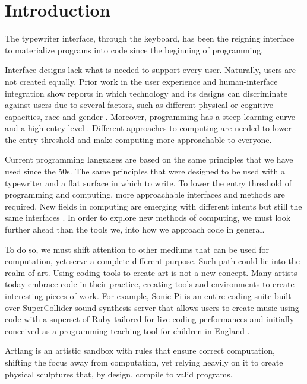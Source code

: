 
\chapter{Introduction}
\label{cha:introduction}
The typewriter interface, through the keyboard, has been the reigning interface to materialize programs into code since the beginning of programming.

Interface designs lack what is needed to support every user. Naturally, users are not created equally.
Prior work in the user experience and human-interface integration show reports in which technology and its designs can discriminate against users due to several factors,
such as different physical or cognitive capacities, race and gender \cite{ko23}.
Moreover, programming has a steep learning curve and a high entry level \cite{bosse17}.
Different approaches to computing are needed to lower the entry threshold and make computing more approachable to everyone.

Current programming languages are based on the same principles that we have used since the 50s.
The same principles that were designed to be used with a typewriter and a flat surface in which to write.
To lower the entry threshold of programming and computing, more approachable interfaces and methods are required.
New fields in computing are emerging with different intents but still the same interfaces \cite{hongji16}.
In order to explore new methods of computing, we must look further ahead than the tools we, into how we approach code in general.

To do so, we must shift attention to other mediums that can be used for computation, yet serve a complete different purpose.
Such path could lie into the realm of art. Using coding tools to create art is not a new concept.
Many artists today embrace code in their practice, creating tools and environments to create interesting pieces of work. 
For example, Sonic Pi is an entire coding suite built over SuperCollider sound synthesis server that allows users to create music using code with a superset of Ruby 
tailored for live coding performances and initially conceived as a programming teaching tool for children in England \cite{aaron16}.

Artlang is an artistic sandbox with rules that ensure correct computation, shifting the focus away from computation, yet relying heavily on it to create physical sculptures that, by design, compile to valid programs.

\endinput